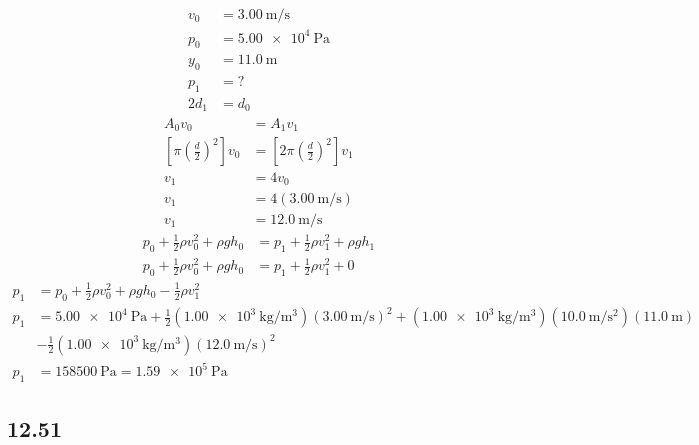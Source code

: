 \documentclass{article}
\begin{document}
\begin{align*}
	v_0 & = \SI{3.00}{\meter \per \second} \\
	p_0 & = \SI{5.00e4}{\pascal} \\
	y_0 & = \SI{11.0}{\meter} \\
	p_1 & = ? \\
	2d_1 & = d_0
\end{align*}
\begin{align*}
	A_0v_0 & = A_1v_1 \\
	\left[ \pi \left( \frac{d}{2} \right)^2 \right]v_0 & = \left[ 2\pi \left( \frac{ d }{ 2 } \right)^2 \right]v_1 \\
	v_1 & = 4v_0 \\
	v_1 & = 4(\SI{3.00}{\meter \per \second}) \\
	v_1 & = \SI{12.0}{\meter \per \second}
\end{align*}
\begin{align*}
	p_0 + \frac{1}{2}\rho v_0^2 + \rho gh_0 & = p_1 + \frac{1}{2}\rho v_1^2 + \rho gh_1 \\
	p_0 + \frac{1}{2}\rho v_0^2 + \rho gh_0 & = p_1 + \frac{1}{2}\rho v_1^2 + 0
\end{align*}
\begin{align*}
	p_1 & = p_0 + \frac{1}{2}\rho v_0^2 + \rho gh_0 - \frac{1}{2}\rho v_1^2 \\
	p_1 & = \SI{5.00e4}{\pascal} + \frac{1}{2}(\SI{1.00e3}{\kilogram \per \meter \cubed})(\SI{3.00}{\meter \per \second})^2 + (\SI{1.00e3}{\kilogram \per \meter \cubed})(\SI{10.0}{\meter \per \second \squared})(\SI{11.0}{\meter}) \\
		& - \frac{1}{2}(\SI{1.00e3}{\kilogram \per \meter \cubed})(\SI{12.0}{\meter \per \second})^2 \\
	p_1 & = \SI{158500}{\pascal} = \SI{1.59e5}{\pascal}
\end{align*}

\subsection{12.51}
\end{document}
